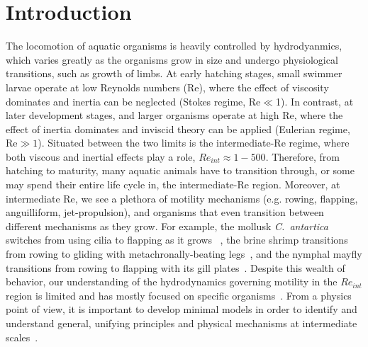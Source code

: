 \documentclass[%
 onecolumn,
superscriptaddress,
 amsmath,amssymb,
 aps,
longbibliography
]{revtex4-2}
\begin{document}
\maketitle


\section{Introduction}
The locomotion of aquatic organisms is heavily controlled by hydrodyanmics, which varies greatly as the organisms grow in size and undergo physiological transitions, such as growth of limbs. At early hatching stages, small swimmer larvae operate at low Reynolds numbers (Re), where the effect of viscosity dominates and inertia can be neglected (Stokes regime, Re$\ll$1). In contrast, at later development stages, and larger organisms operate at high Re, where the effect of inertia dominates and inviscid theory can be applied (Eulerian regime, Re$\gg1$). Situated between the two limits is the intermediate-Re regime, where both viscous and inertial effects play a role, $Re_{int}\approx 1-500$. Therefore, from hatching to maturity, many aquatic animals have to transition through, or some may spend their entire life cycle in, the intermediate-Re region. Moreover, at intermediate Re, we see a plethora of motility mechanisms (e.g. rowing, flapping, anguilliform, jet-propulsion), and organisms that even transition between different mechanisms as they grow. For example, the mollusk \textit{C.~antartica} switches from using cilia to flapping as it grows ~\cite{childress2004transition}, the brine shrimp transitions from rowing to gliding with metachronally-beating legs~\cite{Williams1994}, and the nymphal mayfly transitions from rowing to flapping with its gill plates~\cite{sensenig2009rowing}. 
Despite this wealth of behavior, our understanding of the hydrodynamics governing motility in the $Re_{int}$ region is limited and has mostly focused on specific organisms~\cite{Bartol2009,Herschlag2011,Kern2006,fuiman1988ontogeny,McHenry2003,Strickler1975,Blake1986,Borrell2005,gemmell2015tale,jiang2011does,wilhelmus2014observations,Nawroth2014,jones2016bristles}. From a physics point of view, it is important to develop minimal models in order to identify and understand general, unifying principles and physical mechanisms at intermediate scales~\cite{Klotsa2019Perspective}.
\end{document}

